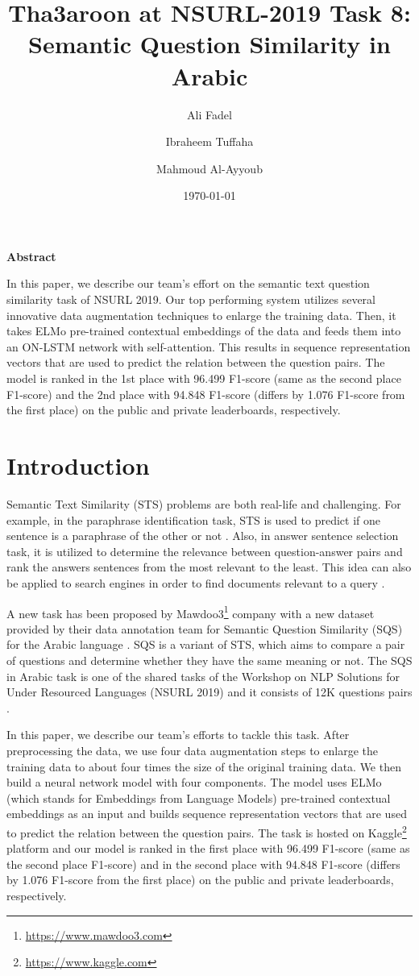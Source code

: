 \documentclass[11pt,a4paper]{article}
\title{Tha3aroon at NSURL-2019 Task 8: Semantic Question Similarity in Arabic}
\author{Ali Fadel}
\author{Ibraheem Tuffaha}
\author{Mahmoud Al-Ayyoub}
\affil{Jordan University of Science and Technology, Irbid, Jordan \authorcr
  \{\tt aliosm1997, bro.t.1996, malayyoub\}@gmail.com}
\date{\today}
\renewenvironment{abstract}{\centerline{\large\bf Abstract}\begin{list}{}{\setlength{\rightmargin}{0.6cm}\setlength{\leftmargin}{0.6cm}}\item[]\ignorespaces}{\unskip\end{list}}
\begin{document}
\maketitle
\begin{abstract}
In this paper, we describe our team's effort on the semantic text question similarity task of NSURL 2019. Our top performing system utilizes several innovative data augmentation techniques to enlarge the training data. Then, it takes ELMo pre-trained contextual embeddings of the data and feeds them into an ON-LSTM network with self-attention. This results in sequence representation vectors that are used to predict the relation between the question pairs. The model is ranked in the 1st place with 96.499 F1-score (same as the second place F1-score) and the 2nd place with 94.848 F1-score (differs by 1.076 F1-score from the first place) on the public and private leaderboards, respectively.
\end{abstract}

\section{Introduction}

Semantic Text Similarity (STS) problems are both real-life and challenging. For example, in the paraphrase identification task, STS is used to predict if one sentence is a paraphrase of the other or not \cite{madnani2012re,he2015multi,zain2017paraphrase}. Also, in answer sentence selection task, it is utilized to determine the relevance between question-answer pairs and rank the answers sentences from the most relevant to the least. This idea can also be applied to search engines in order to find documents relevant to a query \cite{yang2015wikiqa,tan2018multiway,yang2019xlnet}.

A new task has been proposed by Mawdoo3\footnote{\url{ https://www.mawdoo3.com}} company with a new dataset provided by their data annotation team for Semantic Question Similarity (SQS) for the Arabic language \cite{schwab2017semantic,mahmoud2017text,alian2018arabic}. SQS is a variant of STS, which aims to compare a pair of questions and determine whether they have the same meaning or not.
The SQS in Arabic task is one of the shared tasks of the Workshop on NLP Solutions for Under Resourced Languages (NSURL 2019) and it consists of 12K questions pairs \cite{seelawi-EtAl:2019:NSURL}.

In this paper, we describe our team's efforts to tackle this task. After preprocessing the data, we use four data augmentation steps to enlarge the training data to about four times the size of the original training data. We then build a neural network model with four components. The model uses ELMo (which stands for Embeddings from Language Models) \cite{peters2018deep} pre-trained contextual embeddings as an input and builds sequence representation vectors that are used to predict the relation between the question pairs. The task is hosted on Kaggle\footnote{\url{https://www.kaggle.com}} platform and our model is ranked in the first place with 96.499 F1-score (same as the second place F1-score) and in the second place with 94.848 F1-score (differs by 1.076 F1-score from the first place) on the public and private leaderboards, respectively.
\end{document}
